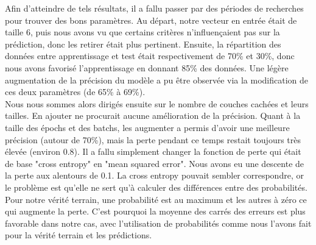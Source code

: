 Afin d'atteindre de tels résultats, il a fallu passer par des périodes de recherches pour trouver des bons paramètres. Au départ, notre vecteur en entrée était de taille 6, puis nous avons vu que certains critères n'influençaient pas sur la prédiction, donc les retirer était plus pertinent. Ensuite, la répartition des données entre apprentissage et test était respectivement de 70\% et 30\%, donc nous avons favorisé l'apprentissage en donnant 85\% des données. Une légère augmentation de la précision du modèle a pu être observée via la modification de ces deux paramètres (de 65\% à 69\%). \\
Nous nous sommes alors dirigés ensuite sur le nombre de couches cachées et leurs tailles. En ajouter ne procurait aucune amélioration de la précision. Quant à la taille des épochs et des batchs, les augmenter a permis d'avoir une meilleure précision (autour de 70\%), mais la perte pendant ce temps restait toujours très élevée (environ 0.8). Il a fallu simplement changer la fonction de perte qui était de base "cross entropy" en "mean squared error". Nous avons eu une descente de la perte aux alentours de 0.1. La cross entropy pouvait sembler correspondre, or le problème est qu'elle ne sert qu'à calculer des différences entre des probabilités. Pour notre vérité terrain, une probabilité est au maximum et les autres à zéro ce qui augmente la perte. C'est pourquoi la moyenne des carrés des erreurs est plus favorable dans notre cas, avec l'utilisation de probabilités comme nous l'avons fait pour la vérité terrain et les prédictions. 
